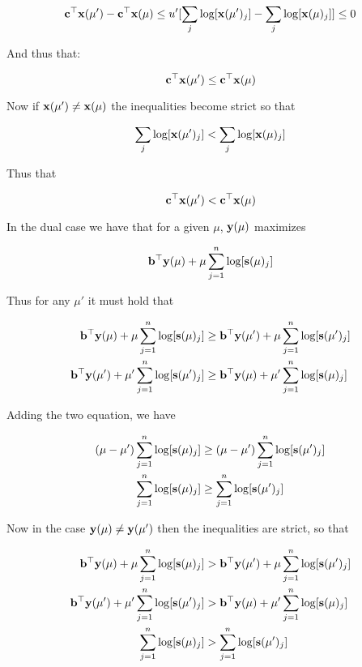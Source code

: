 \documentclass{article} %
\renewcommand\b{{\bf b}}
\newcommand\x{{\bf x}}
\newcommand\cc{{\bf c}}
\renewcommand\b{{\bf b}}
\newcommand\y{{\bf y}}
\newcommand\s{{\bf s}}
\begin{document}
\begin{itemize}
\[
\cc^{\top} \x(\mu') - \cc^{\top} \x(\mu) \leq u'[ \sum_j \log[\x(\mu')_j] - \sum_j \log[\x(\mu)_j]] \leq 0
\]

And thus that:

\[
\cc^{\top} \x(\mu') \leq \cc^{\top} \x(\mu)
\]

Now if $\x(\mu') \neq \x(\mu)$ the inequalities become strict so that 


\[
\sum_{j} \log[\x(\mu')_j]  < \sum_{j} \log[\x(\mu)_j]
\]


Thus that 

\[
\cc^{\top} \x(\mu')  < \cc^{\top} \x(\mu)
\]

In the dual case we have that for a given $\mu$, $\y(\mu)$ maximizes 


\[
\b^{\top} \y(\mu)  + \mu \sum_{j=1}^{n} \log[\s(\mu)_j]
\]

Thus for any $\mu'$ it must hold that 


\begin{equation*}
\begin{aligned}
\b^{\top} \y(\mu)  + \mu \sum_{j=1}^{n} \log[\s(\mu)_j] &\geq \b^{\top} \y(\mu')  + \mu \sum_{j=1}^{n} \log[\s(\mu')_j] \\
\b^{\top} \y(\mu')  + \mu' \sum_{j=1}^{n} \log[\s(\mu')_j] &\geq \b^{\top} \y(\mu)  + \mu' \sum_{j=1}^{n} \log[\s(\mu
)_j] 
\end{aligned}
\end{equation*}

Adding the two equation, we have

\begin{equation*}
\begin{aligned}
(\mu - \mu') \sum_{j=1}^{n} \log[\s(\mu)_j]  &\geq  (\mu - \mu') \sum_{j=1}^{n} \log[\s(\mu')_j] \\ 
 \sum_{j=1}^{n} \log[\s(\mu)_j]  &\geq   \sum_{j=1}^{n} \log[\s(\mu')_j]
\end{aligned}
\end{equation*}

Now in the case $\y(\mu) \neq \y(\mu')$ then the inequalities are strict, so that 

\begin{equation*}
\begin{aligned}
\b^{\top} \y(\mu)  + \mu \sum_{j=1}^{n} \log[\s(\mu)_j] &> \b^{\top} \y(\mu')  + \mu \sum_{j=1}^{n} \log[\s(\mu')_j] \\
\b^{\top} \y(\mu')  + \mu' \sum_{j=1}^{n} \log[\s(\mu')_j] &> \b^{\top} \y(\mu)  + \mu' \sum_{j=1}^{n} \log[\s(\mu
)_j] \\ 
\sum_{j=1}^{n} \log[\s(\mu)_j]  &>  \sum_{j=1}^{n} \log[\s(\mu')_j]
\end{aligned}
\end{equation*}


\end{itemize}
\end{document}
